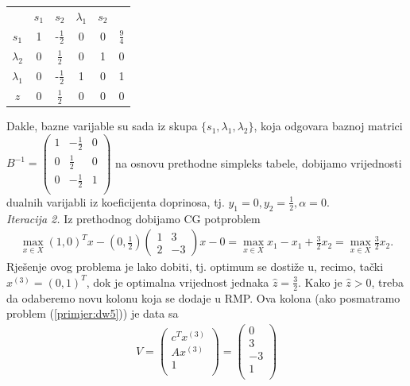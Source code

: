 \documentclass[a4paper, utf8, 11pt, colorlinks]{book}
\theoremstyle{definition}
\begin{document}
\begin{center}
	
	\begin{tabular}{c|ccccc}
	             	&$s_1$     &    $ s_2$                &  $\lambda_1$   & $s_2$     &                \\
		$s_1$	    &   1      &   -$\frac{1}{2}$         &   0         &     0         &  $\frac{9}{4}$ \\
		$\lambda_2$ &   0      &    $\frac{1}{2}$         &   0         &     1         &  0             \\
		$\lambda_1$ &   0      &    -$\frac{1}{2}$        &   1         &     0         &  1             \\ \hline
		$z$         &   0      &    $\frac{1}{2}$         &   0         &    0          &  0
	\end{tabular}
\end{center} 
Dakle, bazne varijable su sada iz skupa $\{s_1, \lambda_1, \lambda_2\}$, koja odgovara baznoj matrici 
$B^{-1} = 
\begin{pmatrix}
	   1 & -\frac{1}{2}    &  0 \\
	   0 & \frac{1}{2}     &  0  \\
	   0 & -\frac{1}{2}    &  1  \\
\end{pmatrix}$
na osnovu prethodne simpleks tabele, dobijamo   vrijednosti dualnih varijabli iz koeficijenta doprinosa, tj. $y_1 = 0, y_2 = \frac{1}{2}, \alpha = 0$. \\
\emph{Iteracija 2.} Iz prethodnog dobijamo CG potproblem 
\begin{align}
	 \max_{x \in X} (1, 0)^T x - \left(0, \frac{1}{2}\right)\left(\begin{array}{cc}
	 	1 & 3 \\
	 	2 & -3
	 \end{array}\right)  x   - 0 = \max_{x \in X}x_1 - x_1 + \frac{3}{2}x_2 = \max_{x \in X} \frac{3}{2}x_2.
\end{align}
Rješenje ovog problema je lako dobiti, tj. optimum se dostiže u, recimo,  tački $x^{(3)}= (0, 1)^T$, dok je optimalna vrijednost jednaka $\hat{z}= \frac{3}{2}$. Kako je $\hat{z} > 0$, treba da odaberemo novu kolonu koja se dodaje u RMP. 
Ova kolona (ako posmatramo problem (\ref{primjer:dw5})) je   data sa 
\begin{align}
	V =   \begin{pmatrix}
		c^T  x^{(3)}\\
		A  x^{(3)}  \\
		1     \\
	\end{pmatrix} = \begin{pmatrix}
		0 \\
		3  \\
		-3  \\
		1\\  
	\end{pmatrix}
\end{align}
\end{document}
